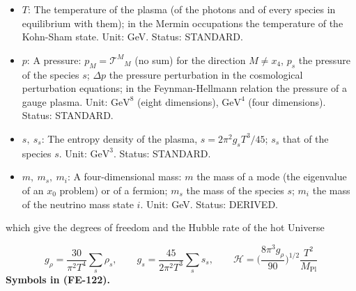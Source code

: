 \documentclass[
  10pt,
]{article}
\begin{document}
\begin{itemize}
  Value: 2.718281828. Status: STANDARD.
\item
  \(T\): The temperature of the plasma (of the photons and of every
  species in equilibrium with them); in the Mermin occupations the
  temperature of the Kohn-Sham state. Unit: GeV. Status: STANDARD.
\item
  \(p\): A pressure: \(p_M = \mathcal{T}^M{}_M\) (no sum) for the
  direction \(M \ne x_4\), \(p_s\) the pressure of the species \(s\);
  \(\Delta p\) the pressure perturbation in the cosmological
  perturbation equations; in the Feynman-Hellmann relation the pressure
  of a gauge plasma. Unit: \(\mathrm{GeV}^{8}\) (eight dimensions),
  \(\mathrm{GeV}^{4}\) (four dimensions). Status: STANDARD.
\item
  \(s,\ s_s\): The entropy density of the plasma,
  \(s = 2\pi^2g_sT^3/45\); \(s_s\) that of the species \(s\). Unit:
  \(\mathrm{GeV}^{3}\). Status: STANDARD.
\item
  \(m,\ m_s,\ m_i\): A four-dimensional mass: \(m\) the mass of a mode
  (the eigenvalue of an \(x_0\) problem) or of a fermion; \(m_s\) the
  mass of the species \(s\); \(m_i\) the mass of the neutrino mass state
  \(i\). Unit: GeV. Status: DERIVED.
\end{itemize}

which give the degrees of freedom and the Hubble rate of the hot
Universe

\[
g_\rho = \frac{30}{\pi^2T^4}\sum_s\rho_s,\qquad g_s = \frac{45}{2\pi^2T^3}\sum_s s_s,\qquad
\mathcal{H} = \Big(\frac{8\pi^3g_\rho}{90}\Big)^{1/2}\frac{T^2}{M_{\mathrm{Pl}}} \tag{FE-122}
\] \textbf{Symbols in (FE-122).}
\end{document}
